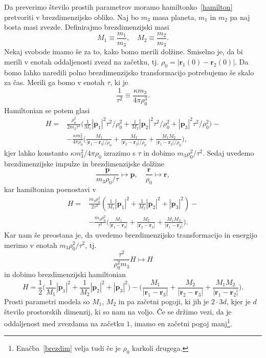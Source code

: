 \documentclass[12pt, a4paper]{article}
\renewcommand{\r}{
    \ensuremath{\mathbf{r}}
}
\newcommand{\p}{
    \ensuremath{\mathbf{p}}
}
\newcommand{\sfrac}[2]{
    \ensuremath{\textstyle{\frac{#1}{#2}}}
}
\newcommand{\Frac}[2]{
    \ensuremath{\displaystyle{\frac{#1}{#2}}}
}
\begin{document}
Da preverimo \v stevilo prostih parametrov moramo hamiltonko~\eqref{hamilton} pretvoriti v brezdimenzijsko
obliko. Naj bo $m_3$ masa planeta, $m_1$ in $m_2$ pa naj bosta masi zvezde. Definirajmo brezdimenzijski
masi
\begin{equation}
    M_1 \equiv \frac{m_1}{m_3}, \quad M_2 \equiv \frac{m_2}{m_3}.
\end{equation}
Nekaj svobode imamo \v se za to, kako bomo merili dol\v zine. Smiselno je, da bi merili v enotah oddaljenosti
zvezd na za\v cetku, tj. $\rho_0 = |\r_1 (0) - \r_2 (0)|$. Da bomo lahko naredili polno brezdimenzijsko
transformacijo potrebujemo \v se skalo za \v cas. Merili ga bomo v enotah $\tau$, ki je
\[
    \frac{1}{\tau^2} \equiv \frac{\kappa m_3}{4\pi\rho_0^3}.
\]
Hamiltonian se potem glasi
\begin{align*}
    H =& \frac{\rho_0^2}{2 m_3\tau^2} \big(\sfrac{1}{M_1}|\p_1|^2\tau^2/\rho_0^2 + \sfrac{1}{M_2}|\p_2|^2\tau^2/\rho_0^2 +
        |\p_3|^2\tau^2/\rho_0^2\big) -\\
       &- \Frac{\kappa m_3^2}{4\pi\rho_0}\bigg(\Frac{M_1}{|\r_1 - \r_3|/\rho_0} + \Frac{M_2}{|\r_2 - \r_3|/\rho_0} +
        \Frac{M_1 M_2}{|\r_1 - \r_2|/\rho_0}\bigg),
\end{align*}
kjer lahko konstanto $\kappa m_3^2/4\pi\rho_0$ izrazimo s $\tau$ in dobimo $m_3\rho_0^2/\tau^2$.
Sedaj uvedemo brezdimenzijske impulze in brezdimenzijske dol\v zine
\begin{equation}
    \frac{\p}{m_3\rho_0/\tau} \mapsto \p, \quad \frac{\r}{\rho_0} \mapsto \r,
\end{equation}
kar hamiltonian poenostavi v
\begin{align*}
    H =& \frac{m_3\rho_0^2}{2\tau^2} (\sfrac{1}{M_1}|\p_1|^2 + \sfrac{1}{M_2}|\p_2|^2 + |\p_3|^2) -\\
       &- \Frac{m_3\rho_0^2}{\tau^2}\bigg(\Frac{M_1}{|\r_1 - \r_3|} + \Frac{M_2}{|\r_2 - \r_3|} +
        \Frac{M_1 M_2}{|\r_1 - \r_2|}\bigg).
\end{align*}
Kar nam \v se preostana je, da uvedemo brezdimenzijsko transformacijo in energijo merimo v enotah
$m_3\rho_0^2/\tau^2$, tj.
\[
    \frac{\tau^2}{\rho_0^2 m_3}H \mapsto H
\]
in dobimo brezdimenzijski hamiltonian
\begin{equation}
    H = \frac{1}{2}\Big(\sfrac{1}{M_1}|\p_1|^2 + \sfrac{1}{M_2}|\p_2|^2 + |\p_3|^2\Big)
        - \bigg(\Frac{M_1}{|\r_1 - \r_3|} + \Frac{M_2}{|\r_2 - \r_3|} + \Frac{M_1 M_2}{|\r_1 - \r_2|}\bigg).
    \label{brezdim}
\end{equation}
Prosti parametri modela so $M_1$, $M_2$ in pa za\v cetni pogoji, ki jih je $2 \cdot 3d$, kjer je $d$
\v stevilo prostorskih dimenzij, ki so nam na voljo. \v Ce se dr\v zimo vezi, da je oddaljenost med zvezdama
na za\v cetku $1$, imamo en za\v cetni pogoj manj\footnote{Ena\v cba~\eqref{brezdim} velja tudi \v ce je
$\rho_0$ karkoli drugega.}.
\end{document}
